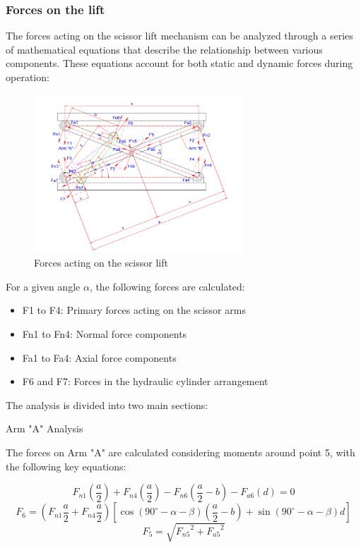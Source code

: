 \documentclass[../../main]{subfiles}
\begin{document}
\subsubsection{Forces on the lift}

The forces acting on the scissor lift mechanism can be analyzed through
a series of mathematical equations that describe the relationship
between various components. These equations account for both static and
dynamic forces during operation:

\begin{figure}[ht]
\centering
\includegraphics[width=0.7\textwidth]{img/image017.png}
\caption{Forces acting on the scissor lift}
\end{figure}

For a given angle $\alpha$, the following forces are calculated:

\begin{itemize}
\item
  F1 to F4: Primary forces acting on the scissor arms
\item
  Fn1 to Fn4: Normal force components
\item
  Fa1 to Fa4: Axial force components
\item
  F6 and F7: Forces in the hydraulic cylinder arrangement
\end{itemize}

The analysis is divided into two main sections:

Arm "A" Analysis

The forces on Arm "A" are calculated considering moments around point 5,
with the following key equations:

\begin{equation}
  F_{n1}\left(\frac{a}{2}\right) + F_{n4}\left(\frac{a}{2}\right) - F_{n6}\left(\frac{a}{2} - b\right) - F_{a6}(d) = 0
  \end{equation}
  \begin{equation}
    F_6 = \left(F_{n1} \frac{a}{2} + F_{n4} \frac{a}{2}\right) \left[\cos(90^\circ - \alpha - \beta)\left(\frac{a}{2} - b\right) + \sin(90^\circ - \alpha - \beta)d\right]
    \end{equation}
    \begin{equation}
      F_5 = \sqrt{{F_{n5}}^2 + {F_{a5}}^2}
  \end{equation}
\end{document}
